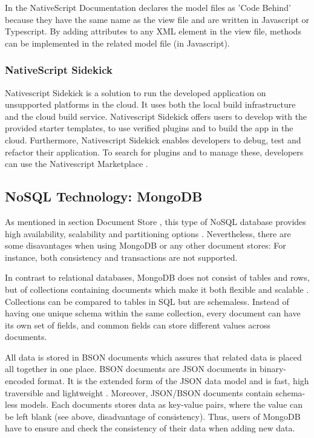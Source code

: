 In the NativeScript Documentation \cite{nativescript} declares the model files as 'Code Behind' because they have the same name as the view file and are written in Javascript or Typescript. By adding attributes to any XML element in the view file, methods can be implemented in the related model file (in Javascript). 

\subsubsection{NativeScript Sidekick} \label{Native}

Nativescript Sidekick is a solution to run the developed application on unsupported platforms in the cloud. It uses both the local build infrastructure and the cloud build service. Nativescript Sidekick offers users to develop with the provided starter templates, to use verified plugins and to build the app in the cloud. Furthermore, Nativescript Sidekick enables developers to debug, test and refactor their application. 
To search for plugins and to manage these, developers can use the Nativescript Marketplace \cite{nsmarket}.

\subsection{NoSQL Technology: MongoDB}\label{mongodb}

As mentioned in section Document Store \pageref{documentstore}, this type of NoSQL database provides high availability, scalability and partitioning options \cite[p.25 ff.]{mongodb_edward}. Nevertheless, there are some disavantages when using MongoDB or any other document stores: For instance, both consistency and transactions are not supported. 

In contrast to relational databases, MongoDB does not consist of tables and rows, but of collections containing documents which make it both flexible and scalable \cite[p.25 ff.]{mongodb_edward}. Collections can be compared to tables in SQL but are schemaless. Instead of having one unique schema within the same collection, every document can have its own set of fields, and common fields can store different values across documents.  

All data is stored in \ac{BSON} documents which assures that related data is placed all together in one place. BSON documents are JSON documents in binary-encoded format. It is the extended form of the JSON data model and is fast, high traversible and lightweight \cite[p.31 ff.]{mongodb_edward}. Moreover, JSON/BSON documents contain schema-less models. Each documents stores data as key-value pairs, where the value can be left blank (see above, disadvantage of consistency). Thus, users of MongoDB have to ensure and check the consistency of their data when adding new data.


